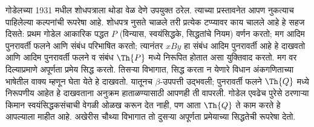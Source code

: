 \documentclass[../../../include/open-logic-section]{subfiles}
\begin{document}


गोडेलच्या 1931 मधील शोधपत्राला थोडा वेळ
देणे उपयुक्त ठरेल. त्याच्या प्रस्तावनेत आपण
नुकत्याच पाहिलेल्या कल्पनांची रूपरेषा आहे.
शोधपत्र नुसते चाळले तरी प्रत्येक टप्प्यावर
काय चालले आहे हे सहज दिसते: प्रथम गोडेल
आकारिक पद्धत $P$ (विन्यास, स्वयंसिद्धके,
सिद्धतांचे नियम) वर्णन करतो; मग आदिम
पुनरावर्ती फलने आणि संबंध परिभाषित करतो;
त्यानंतर $x B y$ हा संबंध आदिम पुनरावर्ती
आहे हे दाखवतो आणि आदिम पुनरावर्ती फलने
व संबंध $\Th{P}$ मध्ये निरूपित होतात
असा युक्तिवाद करतो. मग वर दिल्याप्रमाणे
अपूर्णता प्रमेय सिद्ध करतो. तिसऱ्या विभागात,
सिद्ध करता न येणारे विधान अंकगणिताच्या
भाषेतील वाक्य म्हणून घेता येते हे दाखवतो.
यातूनच $\beta$-उपपत्ती उद्भवली; पुनरावर्ती
फलने $\Th{Q}$ मध्ये निरूपणीय आहेत हे
दाखवताना अनुक्रम हाताळण्यासाठी आपणही ती
वापरली. गोडेल एवढेच पुरेसे ठरणाऱ्या
किमान स्वयंसिद्धकसंचाची वेगळी ओळख करून
देत नाही, पण आता $\Th{Q}$ ते काम करते
हे आपल्याला माहीत आहे. अखेरीस चौथ्या
विभागात तो दुसऱ्या अपूर्णता प्रमेयाच्या
सिद्धतेची रूपरेषा देतो.
\end{document}
